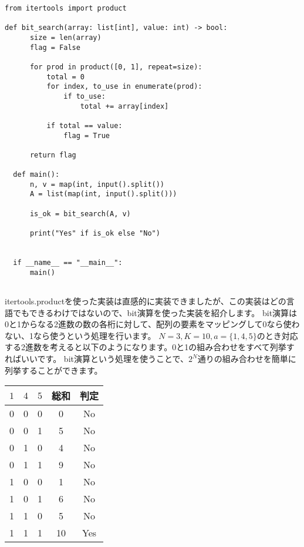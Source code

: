 \documentclass{jlreq}
\begin{document}
\begin{lstlisting}[caption=itertools.productを使ったbit全探索, label=bit_search, frame=TRBL]
from itertools import product

def bit_search(array: list[int], value: int) -> bool:
      size = len(array)
      flag = False
      
      for prod in product([0, 1], repeat=size):
          total = 0
          for index, to_use in enumerate(prod):
              if to_use:
                  total += array[index]
          
          if total == value:
              flag = True
      
      return flag
  
  def main():
      n, v = map(int, input().split())
      A = list(map(int, input().split()))
      
      is_ok = bit_search(A, v)
      
      print("Yes" if is_ok else "No")
                  
  
  if __name__ == "__main__":
      main()
  
\end{lstlisting}

itertools.productを使った実装は直感的に実装できましたが、この実装はどの言語でもできるわけではないので、bit演算を使った実装を紹介します。
bit演算は0と1からなる2進数の数の各桁に対して、配列の要素をマッピングして0なら使わない、1なら使うという処理を行います。
$N = 3, K = 10, a = \{1, 4, 5\}$のとき対応する2進数を考えると以下のようになります。0と1の組み合わせをすべて列挙すればいいです。
bit演算という処理を使うことで、$2^N$通りの組み合わせを簡単に列挙することができます。

\begin{table}[h]
  \centering
  \begin{tabular}{|c|c|c|c|c|}
    \hline
    $1$ & $4$ & $5$ & 総和 & 判定 \\
    \hline
    0 & 0 & 0 & 0 & No \\
    0 & 0 & 1 & 5 & No \\
    0 & 1 & 0 & 4 & No \\
    0 & 1 & 1 & 9 & No \\
    1 & 0 & 0 & 1 & No \\
    1 & 0 & 1 & 6 & No \\
    1 & 1 & 0 & 5 & No \\
    1 & 1 & 1 & 10 & Yes \\
    \hline
  \end{tabular}
\end{table}
\end{document}
